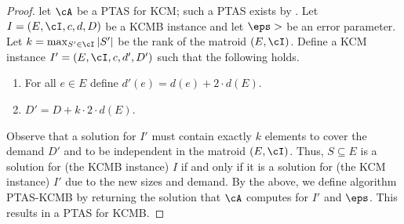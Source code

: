 \begin{proof}
	let $\cA$ be a PTAS for KCM; such a PTAS exists by \cite{chakaravarthy2013knapsack}. Let $I =  (E,\cI,c,d,D)$ be a KCMB instance and let $\eps>$ be an error parameter. %
	Let $k = \max_{S' \in \cI} |S'|$ be the rank of the matroid $(E,\cI)$. Define a KCM instance $I' = (E,\cI,c,d',D')$ such that the following holds. \begin{enumerate}
		\item For all $e \in E$ define $d'(e) = d(e)+2 \cdot d(E)$.
		\item $D' = D+k \cdot 2 \cdot d(E)$. 
	\end{enumerate} Observe that a solution for $I'$ must contain exactly $k$ elements to cover the demand $D'$ and to be independent in the matroid $(E,\cI)$. Thus, $S \subseteq E$ is a solution for (the KCMB instance) $I$ if and only if it is a solution for (the KCM instance) $I'$ due to the new sizes and demand. 
	By the above, we define algorithm PTAS-KCMB by returning the solution that $\cA$ computes for $I'$ and $\eps$. This results in a PTAS for KCMB.
\end{proof}

